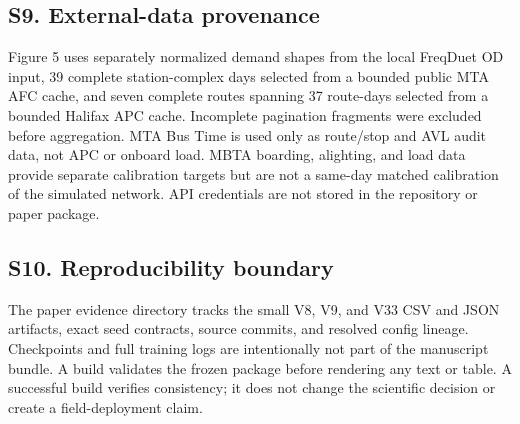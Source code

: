 \documentclass[10pt]{article}
\begin{document}
\subsection{S9. External-data
provenance}\label{s9.-external-data-provenance}

Figure 5 uses separately normalized demand shapes from the local
FreqDuet OD input, 39 complete station-complex days selected from a
bounded public MTA AFC cache, and seven complete routes spanning 37
route-days selected from a bounded Halifax APC cache. Incomplete
pagination fragments were excluded before aggregation. MTA Bus Time is
used only as route/stop and AVL audit data, not APC or onboard load.
MBTA boarding, alighting, and load data provide separate calibration
targets but are not a same-day matched calibration of the simulated
network. API credentials are not stored in the repository or paper
package.

\subsection{S10. Reproducibility
boundary}\label{s10.-reproducibility-boundary}

The paper evidence directory tracks the small V8, V9, and V33 CSV and
JSON artifacts, exact seed contracts, source commits, and resolved
config lineage. Checkpoints and full training logs are intentionally not
part of the manuscript bundle. A build validates the frozen package
before rendering any text or table. A successful build verifies
consistency; it does not change the scientific decision or create a
field-deployment claim.
\end{document}
